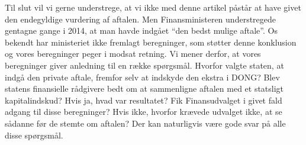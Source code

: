 \documentclass{article}
\begin{document}
Til slut vil vi gerne understrege, at vi ikke med denne artikel påstår at have givet den endegyldige vurdering af aftalen. Men Finansministeren understregede gentagne gange i 2014, at man havde indgået \enquote{den bedst mulige aftale}. 
Os bekendt har ministeriet ikke fremlagt beregninger, som støtter denne konklusion og vores beregninger peger i modsat retning. Vi mener derfor, at vores beregninger giver anledning til en række spørgsmål. Hvorfor valgte staten, at indgå den private aftale, fremfor selv at indskyde den ekstra i DONG? Blev statens finansielle rådgivere bedt om at sammenligne aftalen med et statsligt kapitalindskud? Hvis ja, hvad var resultatet? Fik Finansudvalget i givet fald adgang til disse beregninger? Hvis ikke, hvorfor krævede udvalget ikke, at se sådanne før de stemte om aftalen? Der kan naturligvis være gode svar på alle disse spørgsmål. %

\newpage

\FloatBarrier
\end{document}

